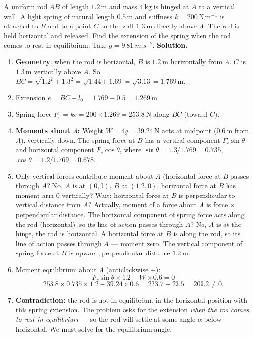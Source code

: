 \documentclass[11pt]{article}
\begin{document}
\begin{exoresolu}
A uniform rod $AB$ of length $1.2\ \mathrm{m}$ and mass $4\ \mathrm{kg}$ is hinged at $A$ to a vertical wall. A light spring of natural length $0.5\ \mathrm{m}$ and stiffness $k=200\ \mathrm{N\,m^{-1}}$ is attached to $B$ and to a point $C$ on the wall $1.3\ \mathrm{m}$ directly above $A$. The rod is held horizontal and released. Find the extension of the spring when the rod comes to rest in equilibrium. Take $g=\SI{9.81}{m.s^{-2}}$.
\tcblower
\textbf{Solution.}
\begin{enumerate}
\item \textbf{Geometry:} when the rod is horizontal, $B$ is $1.2\ \mathrm{m}$ horizontally from $A$. $C$ is $1.3\ \mathrm{m}$ vertically above $A$. So $BC = \sqrt{1.2^2+1.3^2} = \sqrt{1.44+1.69} = \sqrt{3.13} = 1.769\ \mathrm{m}$.
\item Extension $e = BC - l_0 = 1.769 - 0.5 = 1.269\ \mathrm{m}$.
\item Spring force $F_s = k e = 200 \times 1.269 = 253.8\ \mathrm{N}$ along $BC$ (toward $C$).
\item \textbf{Moments about $A$:} Weight $W=4g=39.24\ \mathrm{N}$ acts at midpoint ($0.6\ \mathrm{m}$ from $A$), vertically down. The spring force at $B$ has a vertical component $F_s \sin\theta$ and horizontal component $F_s \cos\theta$, where $\sin\theta = 1.3/1.769 = 0.735$, $\cos\theta = 1.2/1.769 = 0.678$.
\item Only vertical forces contribute moment about $A$ (horizontal force at $B$ passes through $A$? No, $A$ is at $(0,0)$, $B$ at $(1.2,0)$, horizontal force at $B$ has moment arm $0$ vertically? Wait: horizontal force at $B$ is perpendicular to vertical distance from $A$? Actually, moment of a force about $A$ is force $\times$ perpendicular distance. The horizontal component of spring force acts along the rod (horizontal), so its line of action passes through $A$? No, $A$ is at the hinge, the rod is horizontal. A horizontal force at $B$ is along the rod, so its line of action passes through $A$ — moment zero. The vertical component of spring force at $B$ is upward, perpendicular distance $1.2\ \mathrm{m}$.
\item Moment equilibrium about $A$ (anticlockwise +):
\[ F_s \sin\theta \times 1.2 - W \times 0.6 = 0 \]
\[ 253.8 \times 0.735 \times 1.2 - 39.24 \times 0.6 = 223.7 - 23.5 = 200.2 \neq 0. \]
\item \textbf{Contradiction:} the rod is not in equilibrium in the horizontal position with this spring extension. The problem asks for the extension \emph{when the rod comes to rest in equilibrium} — so the rod will settle at some angle $\alpha$ below horizontal. We must solve for the equilibrium angle.

\end{enumerate}
\end{exoresolu}
\end{document}
